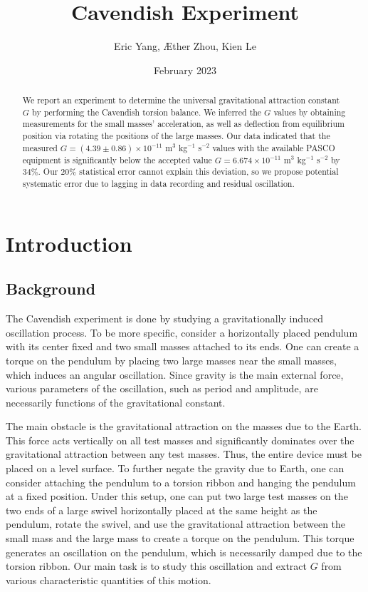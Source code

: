 \documentclass{article}
\title{Cavendish Experiment}
\author{Eric Yang, \AE ther Zhou, Kien Le }
\date{February 2023}
\begin{document}
\maketitle

\begin{abstract}
    We report an experiment to determine the universal gravitational attraction constant $G$ by performing the Cavendish torsion balance. We inferred the $G$ values by obtaining measurements for the small masses' acceleration, as well as deflection from equilibrium position via rotating the positions of the large masses. Our data indicated that the measured $G = (4.39 \pm 0.86) \times 10^{-11}$ m$^3$ kg$^{-1}$ s$^{-2}$ values with the available PASCO equipment is significantly below the accepted value $G = 6.674 \times 10^{-11} $ m$^3$ kg$^{-1}$ s$^{-2}$ by $34\%$. Our $20\%$ statistical error cannot explain this deviation, so we propose potential systematic error due to lagging in data recording and residual oscillation. 

\end{abstract}



\section{Introduction}

\subsection{Background}

The Cavendish experiment is done by studying a gravitationally induced oscillation process. To be more specific, consider a horizontally placed pendulum with its center fixed and two small masses attached to its ends. One can create a torque on the pendulum by placing two large masses near the small masses, which induces an angular oscillation. Since gravity is the main external force, various parameters of the oscillation, such as period and amplitude, are necessarily functions of the gravitational constant. 
    
The main obstacle is the gravitational attraction on the masses due to the Earth. This force acts vertically on all test masses and significantly dominates over the gravitational attraction between any test masses. Thus, the entire device must be placed on a level surface. To further negate the gravity due to Earth, one can consider attaching the pendulum to a torsion ribbon and hanging the pendulum at a fixed position. Under this setup, one can put two large test masses on the two ends of a large swivel horizontally placed at the same height as the pendulum, rotate the swivel, and use the gravitational attraction between the small mass and the large mass to create a torque on the pendulum. This torque generates an oscillation on the pendulum, which is necessarily damped due to the torsion ribbon. Our main task is to study this oscillation and extract $G$ from various characteristic quantities of this motion. 
    
\end{document}
